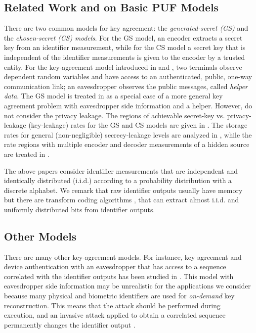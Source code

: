 \documentclass[journal,10pt,twoside]{IEEEtran}
\begin{document}
\subsection{Related Work and on Basic PUF Models}
There are two common models for key agreement: the \textit{generated-secret (GS)} and the \textit{chosen-secret (CS) models}. For the GS model, an encoder extracts a secret key from an identifier measurement, while for the CS model a secret key that is independent of the identifier measurements is given to the encoder by a trusted entity. For the key-agreement model introduced in \cite{AhlswedeCsiz} and \cite{Maurer}, two terminals observe dependent random variables and have access to an authenticated, public, one-way communication link; an eavesdropper observes the public messages, called \textit{helper data}. The GS model is treated in \cite[Thm. 2.6]{csiszarnarayan} as a special case of a more general key agreement problem with eavesdropper side information and a helper. However, \cite{AhlswedeCsiz,Maurer,csiszarnarayan} do not consider the privacy leakage. The regions of achievable secret-key vs. privacy-leakage (key-leakage) rates for the GS and CS models are given in \cite{IgnaTrans,LaiTrans}. The storage rates for general (non-negligible) secrecy-leakage levels are analyzed in \cite{storage}, while the rate regions with multiple encoder and decoder measurements of a hidden source are treated in \cite{bizimTIFSMultipleMeasurement}. 

The above papers consider identifier measurements that are independent and identically distributed (i.i.d.) according to a probability distribution with a discrete alphabet. We remark that raw identifier outputs usually have memory but there are transform coding algorithms \cite[pp. 76]{Transformbio},\cite{OurEntropy} that can extract almost i.i.d. and uniformly distributed bits from identifier outputs.  


\subsection{Other Models}
There are many other key-agreement models. For instance, key agreement and device authentication with an eavesdropper that has access to a sequence correlated with the identifier outputs has been studied in \cite{csiszarnarayan,Khisti,Blochpaper,OurKittipongTIFS}. This model with eavesdropper side information may be unrealistic for the applications we consider because many physical and biometric identifiers are used for \textit{on-demand} key reconstruction. This means that the attack should be performed during execution, and an invasive attack applied to obtain a correlated sequence permanently changes the identifier output \cite{GassendThesis}.
\end{document}
